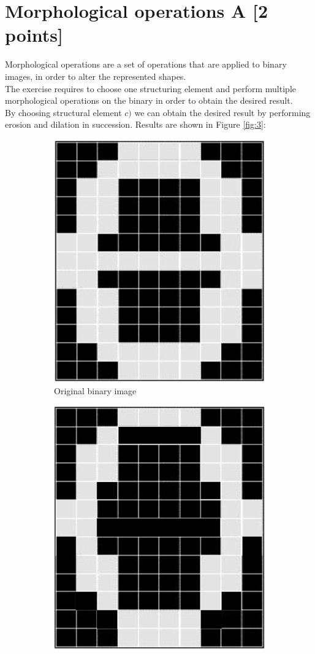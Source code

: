\documentclass[tikz,14pt,fleqn]{article}
\begin{document}
\section{Morphological operations A [2 points]}
Morphological operations are a set of operations that are applied to binary images, in order to alter the represented shapes.\\
The exercise requires to choose one structuring element and perform multiple morphological operations on the binary in order to obtain the desired result.\\
By choosing structural element $c)$ we can obtain the desired result by performing erosion and dilation in succession. Results are shown in Figure \ref{fig:3}:
\begin{figure}[h!]
    \begin{subfigure}[b]{0.33\linewidth}
        \centering
    \includegraphics[width=.5\linewidth]{fig/3.0.png}
    \caption{Original binary image}
    \end{subfigure}
    \begin{subfigure}[b]{0.33\linewidth}
        \centering
        \includegraphics[width=.5\linewidth]{fig/3.1.png}

\end{subfigure}
\end{figure}
\end{document}
